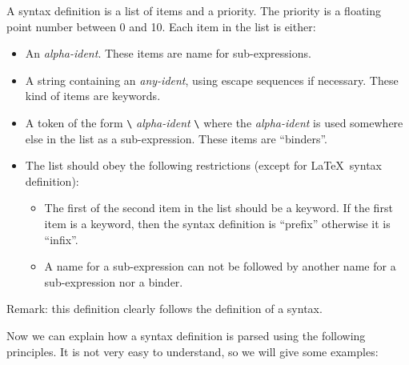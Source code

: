 A syntax definition is a list of items and a priority.
The priority is a floating point number between 0 and 10.
Each item in the list is either:
\begin{itemize}
\item An {\it alpha-ident}. These items are name for sub-expressions.
\item A string containing an {\it any-ident}, using escape sequences if
necessary. These kind of items are keywords.
\item A token of the form \verb#\# {\it alpha-ident} \verb#\# where
the {\it alpha-ident} is used somewhere else in the list as a
sub-expression. These items are ``binders''.
\item The list should obey the following restrictions (except for
\LaTeX\ syntax definition):
\begin{itemize}
\item The first of the second item in the list should be a keyword.
If the first item is a keyword, then the syntax definition is
``prefix'' otherwise it is ``infix''.
\item A  name for a sub-expression can not be followed by another 
name for a sub-expression nor a binder.
\end{itemize}
\end{itemize}

Remark: this definition clearly follows the definition of a syntax.

Now we can explain how a syntax definition is parsed using the
following principles. It is not very easy to understand, so we will
give some examples:

